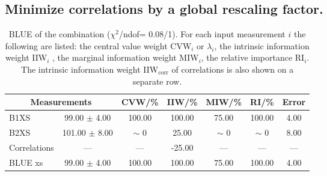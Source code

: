 \subsection{Minimize correlations by a global rescaling factor.}
\begin{table}[H]
\scriptsize
\begin{center}
\renewcommand{\arraystretch}{1.1}
\begin{tabular}{|lc|c|c|c|c|c|}
\hline
\multicolumn{2}{|c|}{Measurements} & CVW/\%  & IIW/\%  & MIW/\%  & RI/\%  & {\tiny Error}\\
\hline
B1XS &      99.00 $\pm$       4.00 &     100.00 &     100.00 &      75.00 &     100.00 &       4.00\\
B2XS &     101.00 $\pm$       8.00 &  {\tiny $\sim$ }0 &      25.00 &  {\tiny $\sim$ }0 &  {\tiny $\sim$ }0 &       8.00\\
Correlations & --- & --- &     -25.00 & --- & --- & ---\\
\hline
BLUE {\tiny xs} &      99.00 $\pm$       4.00 &     100.00 &     100.00 &      75.00 &     100.00 &       4.00\\
\hline
\end{tabular}
\caption{BLUE of the combination ($\chi^2$/ndof=      0.08/1).
 For each input measurement $i$ the following are listed: the central value weight CVW$_i$ or $\lambda_i$, the intrinsic information weight IIW$_i$ , the marginal information weight MIW$_i$, the relative importance RI$_i$. The intrinsic information weight IIW$_{\mathrm{corr}}$ of correlations is also shown on a separate row.}
\renewcommand{\arraystretch}{1}
\end{center}
\end{table}
